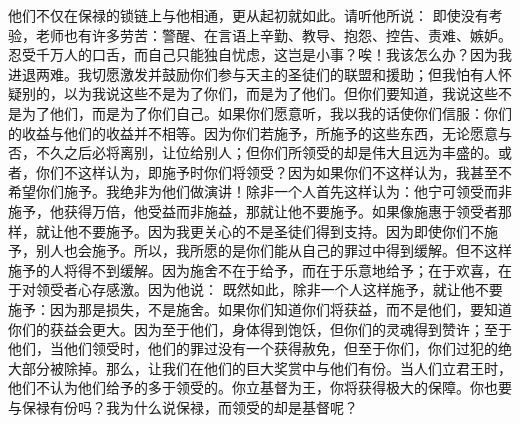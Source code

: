 他们不仅在保禄的锁链上与他相通，更从起初就如此。请听他所说：  即使没有考验，老师也有许多劳苦：警醒、在言语上辛勤、教导、抱怨、控告、责难、嫉妒。忍受千万人的口舌，而自己只能独自忧虑，这岂是小事？唉！我该怎么办？因为我进退两难。我切愿激发并鼓励你们参与天主的圣徒们的联盟和援助；但我怕有人怀疑别的，以为我说这些不是为了你们，而是为了他们。但你们要知道，我说这些不是为了他们，而是为了你们自己。如果你们愿意听，我以我的话使你们信服：你们的收益与他们的收益并不相等。因为你们若施予，所施予的这些东西，无论愿意与否，不久之后必将离别，让位给别人；但你们所领受的却是伟大且远为丰盛的。或者，你们不这样认为，即施予时你们将领受？因为如果你们不这样认为，我甚至不希望你们施予。我绝非为他们做演讲！除非一个人首先这样认为：他宁可领受而非施予，他获得万倍，他受益而非施益，那就让他不要施予。如果像施惠于领受者那样，就让他不要施予。因为我更关心的不是圣徒们得到支持。因为即使你们不施予，别人也会施予。所以，我所愿的是你们能从自己的罪过中得到缓解。但不这样施予的人将得不到缓解。因为施舍不在于给予，而在于乐意地给予；在于欢喜，在于对领受者心存感激。因为他说：  既然如此，除非一个人这样施予，就让他不要施予：因为那是损失，不是施舍。如果你们知道你们将获益，而不是他们，要知道你们的获益会更大。因为至于他们，身体得到饱饫，但你们的灵魂得到赞许；至于他们，当他们领受时，他们的罪过没有一个获得赦免，但至于你们，你们过犯的绝大部分被除掉。那么，让我们在他们的巨大奖赏中与他们有份。当人们立君王时，他们不认为他们给予的多于领受的。你立基督为王，你将获得极大的保障。你也要与保禄有份吗？我为什么说保禄，而领受的却是基督呢？\par

